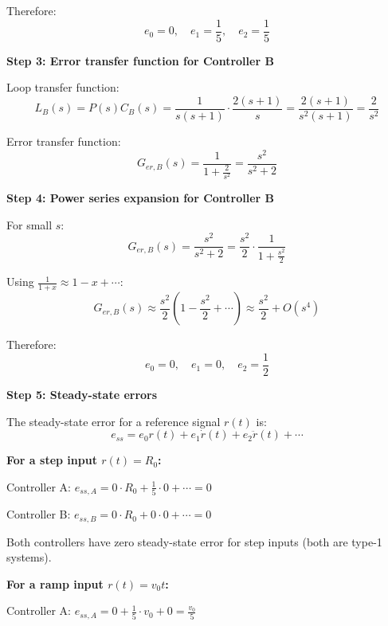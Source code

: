 \documentclass[11pt,a4paper]{article}
\begin{document}
Therefore:
\begin{equation}
	e_0 = 0, \quad e_1 = \frac{1}{5}, \quad e_2 = \frac{1}{5}
\end{equation}

\textbf{Step 3: Error transfer function for Controller B}

Loop transfer function:
\begin{equation}
	L_B(s) = P(s)C_B(s) = \frac{1}{s(s+1)} \cdot \frac{2(s+1)}{s} = \frac{2(s+1)}{s^2(s+1)} = \frac{2}{s^2}
\end{equation}

Error transfer function:
\begin{equation}
	G_{er,B}(s) = \frac{1}{1 + \frac{2}{s^2}} = \frac{s^2}{s^2 + 2}
\end{equation}

\textbf{Step 4: Power series expansion for Controller B}

For small $s$:
\begin{equation}
	G_{er,B}(s) = \frac{s^2}{s^2 + 2} = \frac{s^2}{2} \cdot \frac{1}{1 + \frac{s^2}{2}}
\end{equation}

Using $\frac{1}{1+x} \approx 1 - x + \cdots$:
\begin{equation}
	G_{er,B}(s) \approx \frac{s^2}{2}\left(1 - \frac{s^2}{2} + \cdots\right) \approx \frac{s^2}{2} + O(s^4)
\end{equation}

Therefore:
\begin{equation}
	e_0 = 0, \quad e_1 = 0, \quad e_2 = \frac{1}{2}
\end{equation}

\textbf{Step 5: Steady-state errors}

The steady-state error for a reference signal $r(t)$ is:
\begin{equation}
	e_{ss} = e_0 r(t) + e_1 \dot{r}(t) + e_2 \ddot{r}(t) + \cdots
\end{equation}

\textbf{For a step input $r(t) = R_0$:}

Controller A: $e_{ss,A} = 0 \cdot R_0 + \frac{1}{5} \cdot 0 + \cdots = 0$

Controller B: $e_{ss,B} = 0 \cdot R_0 + 0 \cdot 0 + \cdots = 0$

Both controllers have zero steady-state error for step inputs (both are type-1 systems).

\textbf{For a ramp input $r(t) = v_0 t$:}

Controller A: $e_{ss,A} = 0 + \frac{1}{5} \cdot v_0 + 0 = \frac{v_0}{5}$
\end{document}
